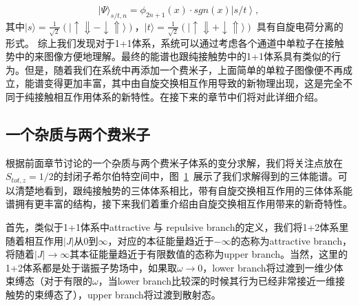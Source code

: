 \begin{equation}
|\Psi\rangle_{s/t,n} = \phi_{2n+1}(x) \cdot sgn(x)\left| s/t \right>, \label{asymptotic_wf}
\end{equation}
其中$|s\rangle = \frac{1}{\sqrt{2}}(|\uparrow\Downarrow - \downarrow\Uparrow\rangle)$，$|t\rangle = \frac{1}{\sqrt{2}}(|\uparrow\Downarrow + \downarrow\Uparrow\rangle)$ 具有自旋电荷分离的形式。
综上我们发现对于1+1体系，系统可以通过考虑各个通道中单粒子在接触势中的来图像方便地理解。最终的能谱也跟纯接触势中的1+1体系\cite{busch1998two}具有类似的行为。但是，随着我们在系统中再添加一个费米子，上面简单的单粒子图像便不再成立，能谱变得更加丰富，其中由自旋交换相互作用导致的新物理出现，这是完全不同于纯接触相互作用体系的新特性。在接下来的章节中们将对此详细介绍。

\subsection{一个杂质与两个费米子}

\begin{figure}[!htbp]
    \centering
    \label{fig:fig2}
\end{figure}
根据前面章节讨论的一个杂质与两个费米子体系的变分求解，我们将关注点放在$S_{tot,z}=1/2$的封闭子希尔伯特空间中，图~\ref{fig:fig2}~展示了我们求解得到的三体能谱。可以清楚地看到，跟纯接触势的三体体系相比，带有自旋交换相互作用的三体体系能谱拥有更丰富的结构，接下来我们着重介绍由自旋交换相互作用带来的新奇特性。

首先，类似于1+1体系中attractive 与 repulsive branch的定义，我们将1+2体系里随着相互作用$|J|$从$0$到$\infty$，对应的本征能量趋近于$-\infty$的态称为attractive branch，将随着$|J|\to\infty$其本征能量趋近于有限数值的态称为upper branch。当然，这里的1+2体系都是处于谐振子势场中，如果取$\omega\to 0$，lower branch将过渡到一维少体束缚态（对于有限的$\omega$，当lower branch比较深的时候其行为已经非常接近一维接触势的束缚态了），upper branch将过渡到散射态。

